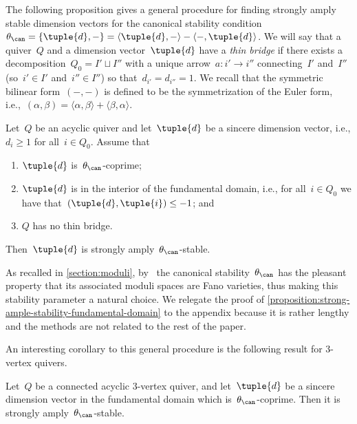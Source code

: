 The following proposition gives a general procedure for
finding strongly amply stable dimension vectors
for the canonical stability condition~$\theta_\can=\{\tuple{d},-\}=\langle\tuple{d},-\rangle-\langle-,\tuple{d}\rangle$.
We will say that a quiver~$Q$ and a dimension vector~$\tuple{d}$
have a \emph{thin bridge}
if there exists a decomposition~$Q_0=I'\sqcup I''$
with a unique arrow~$a\colon i'\to i''$ connecting~$I'$ and~$I''$
(so~$i'\in I'$ and~$i''\in I''$)
so that~$d_{i'}=d_{i''}=1$.
We recall that the symmetric bilinear form~$(-,-)$ is defined to be
the symmetrization of the Euler form, i.e.,~$(\alpha,\beta) = \langle \alpha , \beta\rangle + \langle \beta,\alpha\rangle$.
\begin{proposition}
\label{proposition:strong-ample-stability-fundamental-domain}
Let~$Q$ be an acyclic quiver
and let~$\tuple{d}$ be a sincere dimension vector,
i.e., $d_i\geq 1$ for all~$i\in Q_0$.
Assume that
\begin{enumerate}
\item $\tuple{d}$ is~$\theta_\can$-coprime;
\item $\tuple{d}$ is in the interior of the fundamental domain,
i.e., for all~$i\in Q_0$ we have that~$(\tuple{d},\tuple{i})\leq -1$; and
\item $Q$ has no thin bridge.
\end{enumerate}
Then~$\tuple{d}$ is strongly amply~$\theta_\can$-stable.
\end{proposition}
As recalled in \cref{section:moduli}, by~\cite{MR4352662}
the canonical stability~$\theta_\can$ has the pleasant property
that its associated moduli spaces are Fano varieties,
thus making this stability parameter a natural choice.
We relegate the proof of \cref{proposition:strong-ample-stability-fundamental-domain}
to the appendix because it is rather lengthy
and the methods are not related to the rest of the paper.

An interesting corollary to this general procedure is the following result for $3$-vertex quivers.

\begin{corollary}
\label{corollary:hans}
Let~$Q$ be a connected acyclic $3$-vertex quiver,
and let~$\tuple{d}$ be a sincere dimension vector in the fundamental domain
which is~$\theta_\can$-coprime.
Then it is strongly amply~$\theta_\can$-stable.
\end{corollary}

